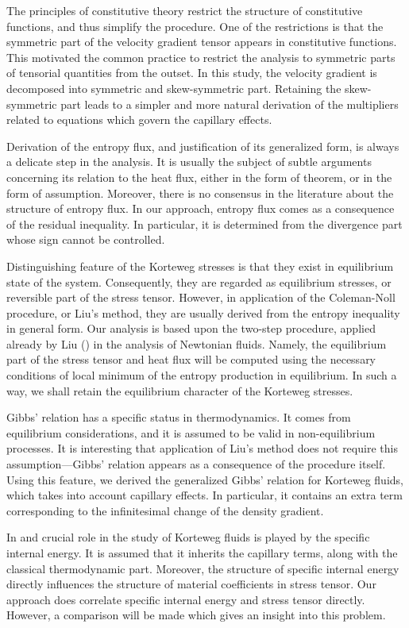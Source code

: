 \documentclass[a4paper,fleqn]{cas-sc}
\theoremstyle{definition}
\begin{document}
The principles of constitutive theory restrict the structure of constitutive functions, and thus simplify the procedure. One of the restrictions is that the symmetric part of the velocity gradient tensor appears in constitutive functions. This motivated the common practice to restrict the analysis to symmetric parts of tensorial quantities from the outset. In this study, the velocity gradient is decomposed into symmetric and skew-symmetric part. Retaining the skew-symmetric part leads to a simpler and more natural derivation of the multipliers related to equations which govern the capillary effects. 

Derivation of the entropy flux, and justification of its generalized form, is always a delicate step in the analysis. It is usually the subject of subtle arguments concerning its relation to the heat flux, either in the form of theorem, or in the form of assumption. Moreover, there is no consensus in the literature about the structure of entropy flux. In our approach, entropy flux comes as a consequence of the residual inequality. In particular, it is determined from the divergence part whose sign cannot be controlled. 

Distinguishing feature of the Korteweg stresses is that they exist in equilibrium state of the system. Consequently, they are regarded as equilibrium stresses, or reversible part of the stress tensor. However, in application of the Coleman-Noll procedure, or Liu's method, they are usually derived from the entropy inequality in general form. Our analysis is based upon the two-step procedure, applied already by Liu (\cite{liu1972method,liu2002continuum}) in the analysis of Newtonian fluids. Namely, the equilibrium part of the stress tensor and heat flux will be computed using the necessary conditions of local minimum of the entropy production in equilibrium. In such a way, we shall retain the equilibrium character of the Korteweg stresses. 

Gibbs' relation has a specific status in thermodynamics. It comes from equilibrium considerations, and it is assumed to be valid in non-equilibrium processes. It is interesting that application of Liu's method does not require this assumption---Gibbs' relation appears as a consequence of the procedure itself. Using this feature, we derived the generalized Gibbs' relation for Korteweg fluids, which takes into account capillary effects. In particular, it contains an extra term corresponding to the infinitesimal change of the density gradient. 

In \cite{anderson1998diffuse} and \cite{heida2010compressible} crucial role in the study of Korteweg fluids is played by the specific internal energy. It is assumed that it inherits the capillary terms, along with the classical thermodynamic part. Moreover, the structure of specific internal energy directly influences the structure of material coefficients in stress tensor. Our approach does correlate specific internal energy and stress tensor directly. However, a comparison will be made which gives an insight into this problem. 
\end{document}
